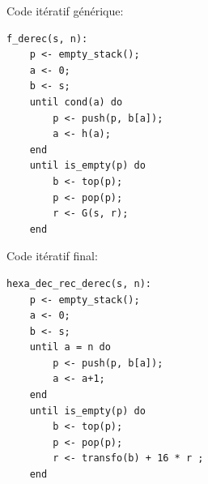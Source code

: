 \documentclass[a4paper, 11pt, oneside]{article}
\begin{document}
\begin{center}
    Code itératif générique:
\end{center}
\begin{lstlisting}
f_derec(s, n):
    p <- empty_stack();
    a <- 0;
    b <- s;
    until cond(a) do
        p <- push(p, b[a]);
        a <- h(a);
    end
    until is_empty(p) do
        b <- top(p);
        p <- pop(p);
        r <- G(s, r);
    end
\end{lstlisting}

\begin{center}
    Code itératif final:
\end{center}
\begin{lstlisting}
hexa_dec_rec_derec(s, n):
    p <- empty_stack();
    a <- 0;
    b <- s;
    until a = n do
        p <- push(p, b[a]);
        a <- a+1;
    end
    until is_empty(p) do
        b <- top(p);
        p <- pop(p);
        r <- transfo(b) + 16 * r ;
    end
\end{lstlisting}
\end{document}
